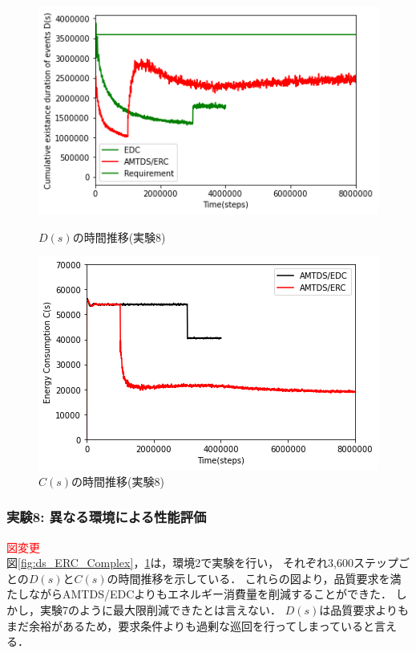 \documentclass[12pt,a4j,twoside]{jarticle}
\def\red#1{\textcolor{red}{#1}}
\begin{document}
  \begin{figure}
    \centering
    \includegraphics[width=0.9\hsize]{figures/ds_graph_3600_ave_ERC_Complex_600.png}
    \caption{$D(s)$の時間推移(実験8)}
    \label{fig:ds_ERC_Complex}
    \vspace{40pt}
    \centering
    \includegraphics[width=0.9\hsize]{figures/cs_graph_3600_ave_ERC_Complex_600.png}
    \caption{$C(s)$の時間推移(実験8)}
    \label{fig:cs_ERC_Complex}
  \end{figure}
  
   
  \subsubsection{実験8: 異なる環境による性能評価}\label{ex:ERC2}
  \red{図変更}\\
  図\ref{fig:ds_ERC_Complex}，\ref{fig:cs_ERC_Complex}は，環境2で実験を行い，
  それぞれ3,600ステップごとの$D(s)$と$C(s)$の時間推移を示している．
  これらの図より，品質要求を満たしながらAMTDS/EDCよりもエネルギー消費量を削減することができた．
  しかし，実験7のように最大限削減できたとは言えない．
  $D(s)$は品質要求よりもまだ余裕があるため，要求条件よりも過剰な巡回を行ってしまっていると言える．
\end{document}
